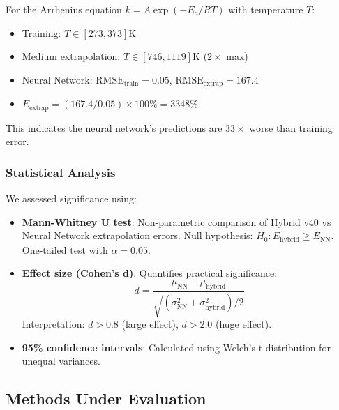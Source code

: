 \documentclass[twoside,11pt]{article}
\begin{document}
\begin{example}
For the Arrhenius equation $k = A \exp(-E_a/RT)$ with temperature $T$:
\begin{itemize}
    \item Training: $T \in [273, 373]$K
    \item Medium extrapolation: $T \in [746, 1119]$K ($2\times$ max)
    \item Neural Network: $\text{RMSE}_{\text{train}} = 0.05$, $\text{RMSE}_{\text{extrap}} = 167.4$
    \item $E_{\text{extrap}} = (167.4 / 0.05) \times 100\% = 3348\%$
\end{itemize}
This indicates the neural network's predictions are $33\times$ worse than training error.
\end{example}

\subsubsection{Statistical Analysis}

We assessed significance using:

\begin{itemize}
    \item \textbf{Mann-Whitney U test}: Non-parametric comparison of Hybrid v40 vs Neural Network extrapolation errors. Null hypothesis: $H_0: E_{\text{hybrid}} \geq E_{\text{NN}}$. One-tailed test with $\alpha = 0.05$.

    \item \textbf{Effect size (Cohen's d)}: Quantifies practical significance:
    \begin{equation}
    d = \frac{\mu_{\text{NN}} - \mu_{\text{hybrid}}}{\sqrt{(\sigma_{\text{NN}}^2 + \sigma_{\text{hybrid}}^2)/2}}
    \end{equation}
    Interpretation: $d > 0.8$ (large effect), $d > 2.0$ (huge effect).

    \item \textbf{95\% confidence intervals}: Calculated using Welch's t-distribution for unequal variances.
\end{itemize}


\subsection{Methods Under Evaluation}
\end{document}
